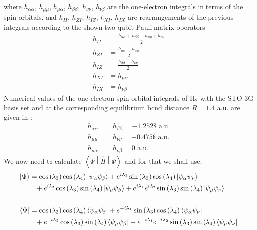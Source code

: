 \documentclass{aux/ttuthes2007}
\newcommand{\bra}[1]{\ensuremath{\left\langle#1\right\vert}}
\newcommand{\ket}[1]{\ensuremath{\left|#1\right\rangle}}
\newcommand{\sandwich}[3]{\left< #1 \middle\vert #2 \middle\vert #3 \right>}
\newcommand{\s}[1]{\sin\left( #1 \right)}
\newcommand{\co}[1]{\cos\left( #1 \right)}
\newcommand{\uo}[1]{
		\IfEqCase{#1}{
			{0}{\mu}
			{1}{\nu}
			{2}{\xi}
		}[\PackageError{uo}{Undefined option to uo: #1}{}]
}
\newcommand{\oo}[1]{
		\IfEqCase{#1}{
			{0}{\alpha}
			{1}{\beta}
			{2}{\gamma}
		}[\PackageError{unocorb}{Undefined option to unuo: #1}{}]
}
\begin{document}
%
where $h_{\alpha\alpha}$, $h_{\mu\mu}$, $h_{\mu\alpha}$, $h_{\beta\beta}$, $h_{\nu\nu}$, $h_{\nu\beta}$
are the one-electron integrals in terms of the spin-orbitals, and
$h_{II}$, $h_{ZI}$, $h_{IZ}$, $h_{XI}$, $h_{IX}$
are rearrangements of the previous integrals according to the shown two-qubit Pauli matrix operators:
%
\begin{equation*}
	\begin{split}
			h_{II}
		&=	\frac{h_{\alpha\alpha} + h_{\beta\beta} + h_{\mu\mu} + h_{\nu\nu}} 2
%
	\\
%
			h_{ZI}
		&=	\frac{h_{\alpha\alpha} - h_{\mu\mu}} 2
%
	\\
%
			h_{IZ}
		&=	\frac{h_{\beta\beta} - h_{\nu\nu}} 2
%
	\\
%
			h_{XI}
		&= 	h_{\mu\alpha}
%
	\\
%
			h_{IX}
		&=	h_{\nu\beta}
	\end{split}
\end{equation*}
%
Numerical values of the one-electron spin-orbital integrals of $\text{H}_2$ with the STO-3G basis set and at the corresponding equilibrium bond distance $R = 1.4 \text{ a.u.}$ are given in :
%
\begin{equation*}
	\begin{split}
		h_{\alpha\alpha} &= h_{\beta\beta} = -1.2528 \text{ a.u.} \\
		h_{\mu\mu} &= h_{\nu\nu} = -0.4756 \text{ a.u.}\\
		h_{\mu\alpha} &= h_{\nu\beta} = 0 \text{ a.u.}
	\end{split}
\end{equation*}
%
We now need to calculate $\sandwich{\Psi}{\hat H}{\Psi}$ and for that we shall use:
%
\begin{equation*}
	\begin{split}
	\ket \Psi 
	&= 
	\co {\lambda_3}\co {\lambda_4}\ket {\psi_{\oo 0}\psi_{\oo 1}}
	+ e^{i\lambda_1}\s {\lambda_3}\co {\lambda_4}\ket{\psi_{\oo 0} \psi_{\uo 1}} 
	\\
	&\phantom{=}
	+ e^{i\lambda_2}\co {\lambda_3 }\s {\lambda_4}\ket {\psi_{\uo 0}\psi_{\oo 1}} 
	+ e^{i\lambda_1}e^{i\lambda_2}\s {\lambda_3}\s {\lambda_4}\ket{\psi_{\uo 0} \psi_{\uo 1}} 
	\\
%
%
	\\
	\bra \Psi 
	&= 
	\co {\lambda_3}\co {\lambda_4}\bra {\psi_{\oo 0}\psi_{\oo 1}}
	+ e^{-i\lambda_1}\s {\lambda_3}\co {\lambda_4}\bra{\psi_{\oo 0} \psi_{\uo 1}} 
	\\
	&\phantom{=}
	+ e^{-i\lambda_2}\co {\lambda_3 }\s {\lambda_4}\bra {\psi_{\uo 0}\psi_{\oo 1}} 
	+ e^{-i\lambda_1}e^{-i\lambda_2}\s {\lambda_3}\s {\lambda_4}\bra{\psi_{\uo 0} \psi_{\uo 1}} 
%
%
	\\
	\end{split}
\end{equation*}
\end{document}
